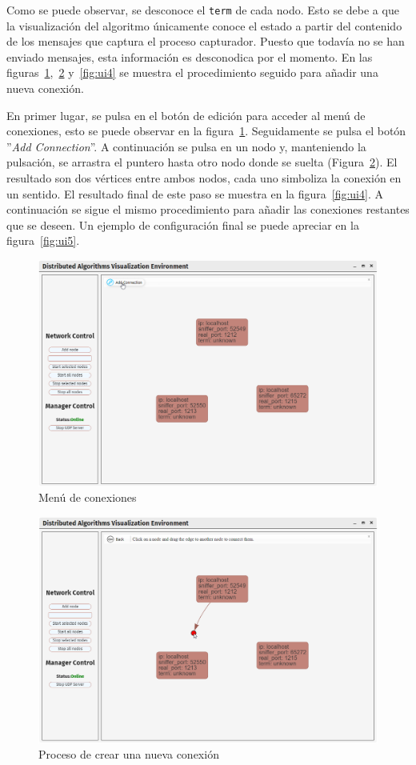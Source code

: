 Como se puede observar, se desconoce el \texttt{term} de cada nodo. Esto se debe a que la visualización del algoritmo únicamente conoce el estado a partir del contenido de los mensajes que captura el proceso capturador. Puesto que todavía no se han enviado mensajes, esta información es desconodica por el momento. En las figuras~\ref{fig:ui2},~\ref{fig:ui3} y~\ref{fig:ui4} se muestra el procedimiento seguido para añadir una nueva conexión.

En primer lugar, se pulsa en el botón de edición para acceder al menú de conexiones, esto se puede observar en la figura~\ref{fig:ui2}. Seguidamente se pulsa el botón ''\textit{Add Connection}''. A continuación se pulsa en un nodo y, manteniendo la pulsación, se arrastra el puntero hasta otro nodo donde se suelta (Figura~\ref{fig:ui3}). El resultado son dos vértices entre ambos nodos, cada uno simboliza la conexión en un sentido. El resultado final de este paso se muestra en la figura~\ref{fig:ui4}. A continuación se sigue el mismo procedimiento para añadir las conexiones restantes que se deseen. Un ejemplo de configuración final se puede apreciar en la figura~\ref{fig:ui5}.

\begin{figure}[p]
  \centering
  \includegraphics[width=0.9\linewidth]{imagenes/ui2}
  \caption{Menú de conexiones}
  \label{fig:ui2}
\end{figure}

\begin{figure}[p]
  \centering
  \includegraphics[width=0.9\linewidth]{imagenes/ui3}
  \caption{Proceso de crear una nueva conexión}
  \label{fig:ui3}
\end{figure}

